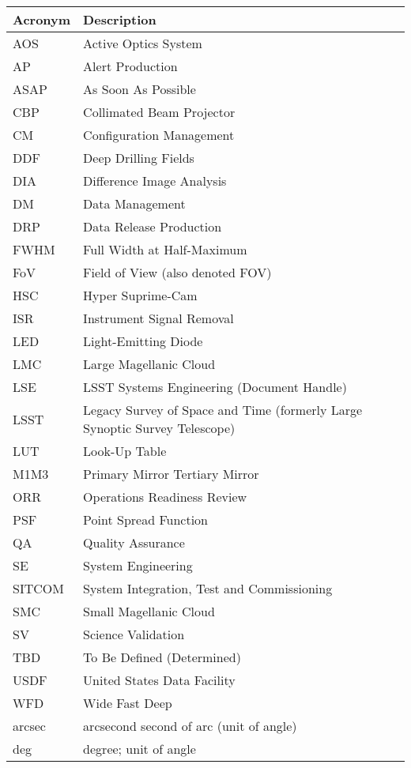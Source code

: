 \addtocounter{table}{-1}
\begin{longtable}{p{}p{}}\hline
\textbf{Acronym} & \textbf{Description}  \\\hline

AOS & Active Optics System \\\hline
AP & Alert Production \\\hline
ASAP & As Soon As Possible \\\hline
CBP & Collimated Beam Projector \\\hline
CM & Configuration Management \\\hline
DDF & Deep Drilling Fields \\\hline
DIA & Difference Image Analysis \\\hline
DM & Data Management \\\hline
DRP & Data Release Production \\\hline
FWHM & Full Width at Half-Maximum \\\hline
FoV & Field of View (also denoted FOV) \\\hline
HSC & Hyper Suprime-Cam \\\hline
ISR & Instrument Signal Removal \\\hline
LED & Light-Emitting Diode \\\hline
LMC & Large Magellanic Cloud \\\hline
LSE & LSST Systems Engineering (Document Handle) \\\hline
LSST & Legacy Survey of Space and Time (formerly Large Synoptic Survey Telescope) \\\hline
LUT & Look-Up Table \\\hline
M1M3 & Primary Mirror Tertiary Mirror \\\hline
ORR & Operations Readiness Review \\\hline
PSF & Point Spread Function \\\hline
QA & Quality Assurance \\\hline
SE & System Engineering \\\hline
SITCOM & System Integration, Test and Commissioning \\\hline
SMC & Small Magellanic Cloud \\\hline
SV & Science Validation \\\hline
TBD & To Be Defined (Determined) \\\hline
USDF & United States Data Facility \\\hline
WFD & Wide Fast Deep \\\hline
arcsec & arcsecond second of arc (unit of angle) \\\hline
deg & degree; unit of angle \\\hline
\end{longtable}
